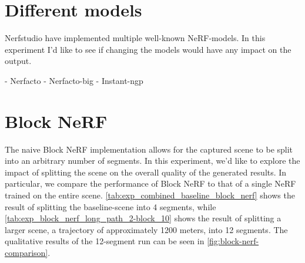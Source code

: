 \section{Different models}
Nerfstudio have implemented multiple well-known NeRF-models. In this experiment I'd like to see if changing the models would have any impact on the output.

- Nerfacto
- Nerfacto-big
- Instant-ngp





















\section{Block NeRF}

The naive Block NeRF implementation allows for the captured scene to be split into an arbitrary number of segments. In this experiment, we'd like to explore the impact of splitting the scene on the overall quality of the generated results. In particular, we compare the performance of Block NeRF to that of a single NeRF trained on the entire scene. \autoref{tab:exp_combined_baseline_block_nerf} shows the result of splitting the baseline-scene into 4 segments, while \autoref{tab:exp_block_nerf_long_path_2-block_10} shows the result of splitting a larger scene, a trajectory of approximately 1200 meters, into 12 segments. The qualitative results of the 12-segment run can be seen in \autoref{fig:block-nerf-comparison}.


